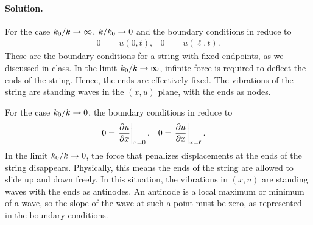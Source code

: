 \documentclass[11pt]{article}
\newenvironment{solution}
{
    \paragraph{Solution.}
    \ignorespaces
}
{
}
\begin{document}
\begin{solution}
	For the case $k_0 / k \to \infty$, $k / k_0 \to 0$ and the boundary conditions in \label{bcs} reduce to
	\begin{align}
		0 &= u(0, t), &
		0 &= u(\ell, t).
	\end{align}
	These are the boundary conditions for a string with fixed endpoints, as we discussed in class.  In the limit $k_0 / k \to \infty$, infinite force is required to deflect the ends of the string.  Hence, the ends are effectively fixed.  The vibrations of the string are standing waves in the $(x, u)$ plane, with the ends as nodes.
	
	For the case $k_0 / k \to 0$, the boundary conditions in \label{bcs} reduce to
	\begin{align}
		0 &= \left. \pdv{u}{x} \right|_{x=0}, &
		0 &= \left. \pdv{u}{x} \right|_{x=\ell}.
	\end{align}
	In the limit $k_0 / k \to 0$, the force that penalizes displacements at the ends of the string disappears.  Physically, this means the ends of the string are allowed to slide up and down freely.  In this situation, the vibrations in $(x, u)$ are standing waves with the ends as antinodes.  An antinode is a local maximum or minimum of a wave, so the slope of the wave at such a point must be zero, as represented in the boundary conditions.
\end{solution}
	


\end{document}
